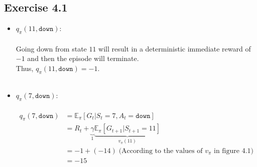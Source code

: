 \documentclass{article}
\begin{document}
\subsection*{Exercise 4.1}
\begin{itemize}
    \item \underline{$q_{\pi}(11,\texttt{down})$}:\\\\
    Going down from state $11$ will result in a deterministic immediate reward of $-1$ and then the episode will terminate.\\
    Thus, $q_{\pi}(11,\texttt{down})=-1$.\\\\

    \item \underline{$q_{\pi}(7,\texttt{down})$}:\\\\
    \begin{equation*}
        \begin{aligned}
            q_{\pi}(7,\texttt{down}) &= \mathbb{E}_{\pi}[G_{t} | S_t=7, A_t=\texttt{down}]\\
            &= R_{t} + \underbrace{\gamma}_{1}\underbrace{\mathbb{E}_{\pi}[G_{t+1} | S_{t+1}=11]}_{v_{\pi}(11)}\\
            &= -1 + (-14)\; \text{(According to the values of $v_{\pi}$ in figure $4.1$)}\\   
            &= -15\\
        \end{aligned}
    \end{equation*}
\end{itemize}
\end{document}

